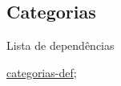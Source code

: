 \subsection{Categorias}
\label{categorias-ex}
\begin{titlemize}{Lista de dependências}
	\item \hyperref[categorias-def]{categorias-def};\\ %

\end{titlemize}

